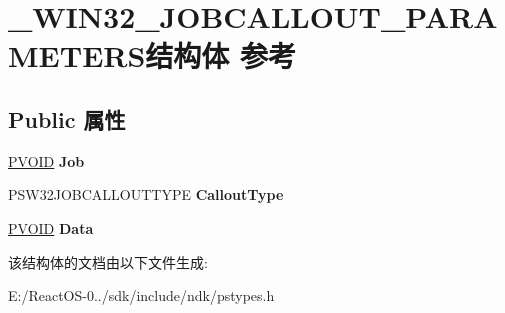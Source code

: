 \hypertarget{struct___w_i_n32___j_o_b_c_a_l_l_o_u_t___p_a_r_a_m_e_t_e_r_s}{}\section{\+\_\+\+W\+I\+N32\+\_\+\+J\+O\+B\+C\+A\+L\+L\+O\+U\+T\+\_\+\+P\+A\+R\+A\+M\+E\+T\+E\+R\+S结构体 参考}
\label{struct___w_i_n32___j_o_b_c_a_l_l_o_u_t___p_a_r_a_m_e_t_e_r_s}
\subsection*{Public 属性}
\begin{DoxyCompactItemize}
\item 
\mbox{\label{struct___w_i_n32___j_o_b_c_a_l_l_o_u_t___p_a_r_a_m_e_t_e_r_s_a43c882319e30fa9e9331829bb5768384}} 
\hyperlink{interfacevoid}{P\+V\+O\+ID} {\bfseries Job}
\item 
\mbox{\label{struct___w_i_n32___j_o_b_c_a_l_l_o_u_t___p_a_r_a_m_e_t_e_r_s_a0250b0f138cd9026a409168a1307c5fa}} 
P\+S\+W32\+J\+O\+B\+C\+A\+L\+L\+O\+U\+T\+T\+Y\+PE {\bfseries Callout\+Type}
\item 
\mbox{\label{struct___w_i_n32___j_o_b_c_a_l_l_o_u_t___p_a_r_a_m_e_t_e_r_s_a6f70cc949006cd91839c25a268909186}} 
\hyperlink{interfacevoid}{P\+V\+O\+ID} {\bfseries Data}
\end{DoxyCompactItemize}


该结构体的文档由以下文件生成\+:\begin{DoxyCompactItemize}
\item 
E\+:/\+React\+O\+S-\/0../sdk/include/ndk/pstypes.\+h\end{DoxyCompactItemize}
